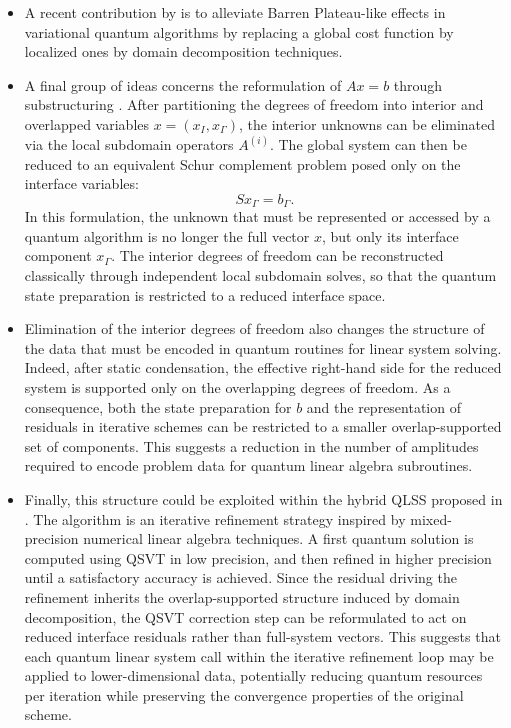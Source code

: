\documentclass[onefignum,onetabnum]{siamart251216}
\begin{document}
\begin{itemize}
    \item A recent contribution by \cite{busaleh2026mitigatingbarrenplateausdomain} is to alleviate Barren Plateau-like effects in variational quantum algorithms by replacing a global cost function by localized ones by domain decomposition techniques. 
\item A final group of ideas concerns the reformulation of $Ax=b$ through substructuring \cite[Chap. 4, 5, 6]{zbMATH02113718}. After partitioning the degrees of freedom into interior and overlapped variables $x = (x_I, x_\Gamma)$, the interior unknowns can be eliminated via the local subdomain operators $A^{(i)}$. The global system can then be reduced to an equivalent Schur complement problem posed only on the interface variables:
\[
S x_\Gamma = b_\Gamma.
\]
In this formulation, the unknown that must be represented or accessed by a quantum algorithm is no longer the full vector $x$, but only its interface component $x_\Gamma$. The interior degrees of freedom can be reconstructed classically through independent local subdomain solves, so that the quantum state preparation is restricted to a reduced interface space.
\item Elimination of the interior degrees of freedom also changes the structure of the data that must be encoded in quantum routines for linear system solving. Indeed, after static condensation, the effective right-hand side for the reduced system is supported only on the overlapping degrees of freedom. As a consequence, both the state preparation for $b$ and the representation of residuals in iterative schemes can be restricted to a smaller overlap-supported set of components. This suggests a reduction in the number of amplitudes required to encode problem data for quantum linear algebra subroutines.
\item Finally, this structure could be exploited within the hybrid QLSS proposed in \cite{Koska:2025ucz}. The algorithm is an iterative refinement strategy inspired by mixed-precision numerical linear algebra techniques.  A first quantum solution is computed using QSVT in low precision, and then refined in higher precision until a satisfactory accuracy is achieved. Since the residual driving the refinement inherits the overlap-supported structure induced by domain decomposition, the QSVT correction step can be reformulated to act on reduced interface residuals rather than full-system vectors. This suggests that each quantum linear system call within the iterative refinement loop may be applied to lower-dimensional data, potentially reducing quantum resources per iteration while preserving the convergence properties of the original scheme.
\end{itemize}
\end{document}
